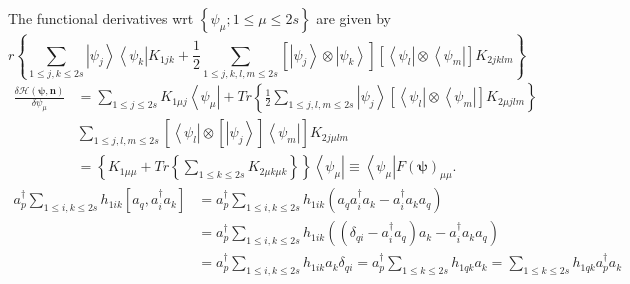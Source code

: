\documentclass[aps,preprint]{revtex4}%
\begin{document}
The functional derivatives wrt $\left\{  \psi_{\mu};1\leq\mu\leq2s\right\}  $
are given by%
\begin{equation}
r\left\{  \sum_{1\leq j,k\leq2s}\left\vert \psi_{j}\right\rangle \left\langle
\psi_{k}\right\vert K_{1jk}+\frac{1}{2}\sum_{1\leq j,k,l,m\leq2s}\left[
\left\vert \psi_{j}\right\rangle \otimes\left\vert \psi_{k}\right\rangle
\right]  \left[  \left\langle \psi_{l}\right\vert \otimes\left\langle \psi
_{m}\right\vert \right]  K_{2jklm}\right\}
\end{equation}%
\begin{align}
\frac{\delta\mathcal{H}\left(  \mathbf{\psi,n}\right)  }{\delta\psi_{\mu}}  &
=\sum_{1\leq j\leq2s}K_{1\mu j}\left\langle \psi_{\mu}\right\vert +Tr\left\{
\frac{1}{2}\sum_{1\leq j,l,m\leq2s}\left\vert \psi_{j}\right\rangle \left[
\left\langle \psi_{l}\right\vert \otimes\left\langle \psi_{m}\right\vert
\right]  K_{2\mu jlm}\right\} \nonumber\\
&  \sum_{1\leq j,l,m\leq2s}\left[  \left\langle \psi_{l}\right\vert
\otimes\left[  \left\vert \psi_{j}\right\rangle \right]  \left\langle \psi
_{m}\right\vert \right]  K_{2j\mu lm}\\
&  =\left\{  K_{1\mu\mu}+Tr\left\{  \sum_{1\leq k\leq2s}K_{2\mu k\mu
k}\right\}  \right\}  \left\langle \psi_{\mu}\right\vert \equiv\left\langle
\psi_{\mu}\right\vert F\left(  \mathbf{\psi}\right)  _{\mu\mu}.
\end{align}%
\begin{align}
a_{p}^{\dagger}\sum_{1\leq i,k\leq2s}h_{1ik}\left[  a_{q},a_{i}^{\dagger}%
a_{k}\right]   &  =a_{p}^{\dagger}\sum_{1\leq i,k\leq2s}h_{1ik}\left(
a_{q}a_{i}^{\dagger}a_{k}-a_{i}^{\dagger}a_{k}a_{q}\right) \nonumber\\
&  =a_{p}^{\dagger}\sum_{1\leq i,k\leq2s}h_{1ik}\left(  \left(  \delta
_{qi}-a_{i}^{\dagger}a_{q}\right)  a_{k}-a_{i}^{\dagger}a_{k}a_{q}\right)
\nonumber\\
&  =a_{p}^{\dagger}\sum_{1\leq i,k\leq2s}h_{1ik}a_{k}\delta_{qi}%
=a_{p}^{\dagger}\sum_{1\leq k\leq2s}h_{1qk}a_{k}=\sum_{1\leq k\leq2s}%
h_{1qk}a_{p}^{\dagger}a_{k}%
\end{align}%
\end{document}
